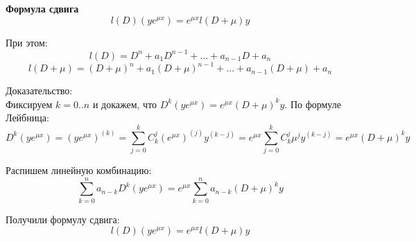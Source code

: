 \documentclass{article}
\begin{document}
	
	\textbf{Формула сдвига}\\

	\begin{equation}
		l(D)(ye^{\mu x}) = e^{\mu x} l(D+\mu)y
	\end{equation}

	При этом:
	\begin{equation}
		l(D) = D^n + a_1D^{n-1} + ... + a_{n-1}D + a_n
	\end{equation}
	\begin{equation}
		l(D+\mu) = (D+\mu)^n + a_1 (D+\mu)^{n-1} + ... + a_{n-1}(D+\mu)+a_n
	\end{equation}

	Доказательство:\\

	Фиксируем $k = 0..n$ и докажем, что $D^k(ye^{\mu x})=e^{\mu x}(D+\mu)^k y$. По формуле Лейбница:
	\begin{equation}
		D^k(ye^{\mu x}) = (ye^{\mu x})^{(k)} = \sum_{j=0}^k C_k^j(e^{\mu x})^{(j)}y^{(k-j)} = e^{\mu x}\sum_{j=0}^k C_k^j\mu^j y^{(k-j)} = e^{\mu x}(D+\mu)^k y
	\end{equation}

	Распишем линейную комбинацию:
	\begin{equation}
		\sum_{k=0}^n a_{n-k} D^k(ye^{\mu x}) = e^{\mu x}\sum_{k=0}^n a_{n-k} (D+\mu)^k y
	\end{equation}

	Получили формулу сдвига:
	\begin{equation}
		l(D)(ye^{\mu x}) = e^{\mu x}l(D+\mu)y
	\end{equation}
\end{document}
